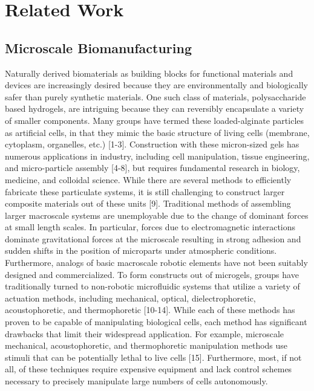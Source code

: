 \section{Related Work}\label{sec:RelatedWork}


\subsection{Microscale Biomanufacturing}
Naturally derived biomaterials as building blocks for functional materials and devices are increasingly desired because they are environmentally and biologically safer than purely synthetic materials. One such class of materials, polysaccharide based hydrogels, are intriguing because they can reversibly encapsulate a variety of smaller components. Many groups have termed these loaded-alginate particles as artificial cells, in that they mimic the basic structure of living cells (membrane, cytoplasm, organelles, etc.) \cite{chang2005therapeutic} [1-3]. Construction with these micron-sized gels has numerous applications in industry, including cell manipulation, tissue engineering, and micro-particle assembly [4-8], but requires fundamental research in biology, medicine, and colloidal science. While there are several methods to efficiently fabricate these particulate systems, it is still challenging to construct larger composite materials out of these units [9]. Traditional methods of assembling larger macroscale systems are unemployable due to the change of dominant forces at small length scales. In particular, forces due to electromagnetic interactions dominate gravitational forces at the microscale resulting in strong adhesion and sudden shifts in the position of microparts under atmospheric conditions. Furthermore, analogs of basic macroscale robotic elements have not been suitably designed and commercialized. To form constructs out of microgels, groups have traditionally turned to non-robotic microfluidic systems that utilize a variety of actuation methods, including mechanical, optical, dielectrophoretic, acoustophoretic, and thermophoretic [10-14]. While each of these methods has proven to be capable of manipulating biological cells, each method has significant drawbacks that limit their widespread application. For example, microscale mechanical, acoustophoretic, and thermophoretic manipulation methods use stimuli that can be potentially lethal to live cells [15]. Furthermore, most, if not all, of these techniques require expensive equipment and lack control schemes necessary to precisely manipulate large numbers of cells autonomously.

